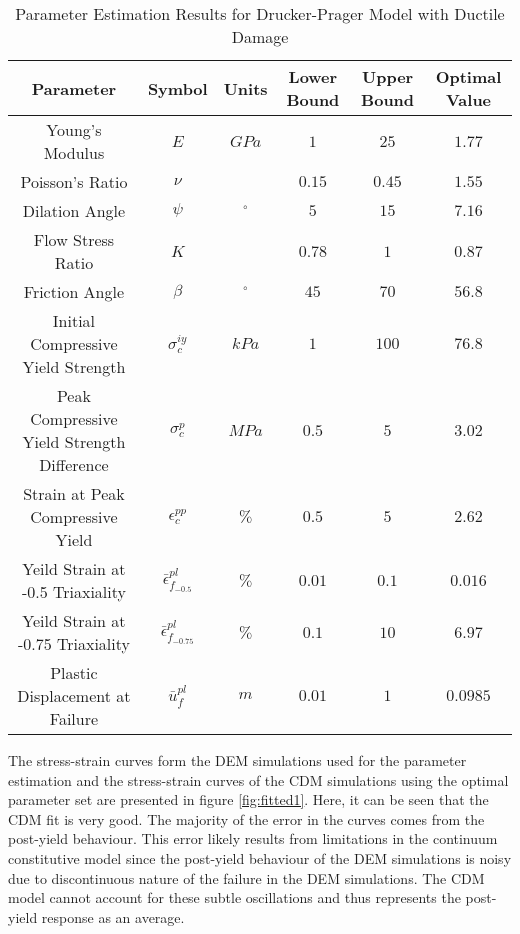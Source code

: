 \begin{table}[]
\centering
\caption{Parameter Estimation Results for Drucker-Prager Model with Ductile Damage}
\label{tab:paramDrucker}
\begin{tabular}{@{}cccccc@{}}
\toprule
Parameter                                  & Symbol                            & Units      & Lower Bound & Upper Bound & Optimal Value \\ \midrule
Young's Modulus                            & $E$                               & $GPa$      & $1$         & $25$        & $1.77$        \\
Poisson's Ratio                            & $\nu$                             &            & $0.15$      & $0.45$      & $1.55$        \\
Dilation Angle                             & $\psi$                            & $^{\circ}$ & $5$         & $15$        & $7.16$        \\
Flow Stress Ratio                          & $K$                               &            & $0.78$      & $1$         & $0.87$        \\
Friction Angle                             & $\beta$                           & $^{\circ}$ & $45$        & $70$        & $56.8$        \\
Initial Compressive Yield Strength         & $\sigma_c^{iy}$                   & $kPa$      & $1$         & $100$       & $76.8$        \\
Peak Compressive Yield Strength Difference & $\sigma_c^{p}$                    & $MPa$      & $0.5$       & $5$         & $3.02$        \\
Strain at Peak Compressive Yield           & $\epsilon_c^{pp}$                 & $\%$       & $0.5$       & $5$         & $2.62$        \\
Yeild Strain at -0.5 Triaxiality           & $\bar{\epsilon}^{pl}_{f_{-0.5}}$  & $\%$       & $0.01$      & $0.1$       & $0.016$       \\
Yeild Strain at -0.75 Triaxiality          & $\bar{\epsilon}^{pl}_{f_{-0.75}}$ & $\%$       & $0.1$       & $10$        & $6.97$        \\
Plastic Displacement at Failure            & $\bar{u}^{pl}_f$                  & $m$        & $0.01$      & $1$         & $0.0985$      \\ \bottomrule
\end{tabular}
\end{table}

The stress-strain curves form the DEM simulations used for the parameter estimation and the stress-strain curves of the CDM simulations using the optimal parameter set are presented in figure \ref{fig:fitted1}. Here, it can be seen that the CDM fit is very good. The majority of the error in the curves comes from the post-yield behaviour. This error likely results from limitations in the continuum constitutive model since the post-yield behaviour of the DEM simulations is noisy due to discontinuous nature of the failure in the DEM simulations. The CDM model cannot account for these subtle oscillations and thus represents the post-yield response as an average. 
